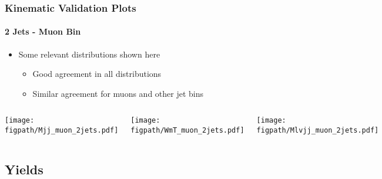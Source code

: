 
\begin{frame}
	\frametitle{Kinematic Validation Plots}
	\framesubtitle{2 Jets - Muon Bin}
	\begin{block}{}
		\begin{itemize}
			\item Some relevant distributions shown here
			\begin{itemize}
			 	\item Good agreement in all distributions
			 	\item Similar agreement for muons and other jet bins 
			 \end{itemize}
		\end{itemize}
	\end{block}
	\vspace*{-0.24cm}
	\begin{columns}[T]
			\begin{block}{\scriptsize \Mjj}
				\texttt{[image: \\figpath/Mjj\_muon\_2jets.pdf]}%
			\end{block}
			\begin{block}{\scriptsize \Mlv}
				\texttt{[image: \\figpath/WmT\_muon\_2jets.pdf]}%
			\end{block}
			\begin{block}{\scriptsize \Mlvjj}
				\texttt{[image: \\figpath/Mlvjj\_muon\_2jets.pdf]}%
			\end{block}
	\end{columns}
\end{frame}


\subsection*{Yields}



